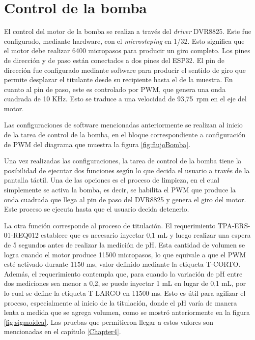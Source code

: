 \section{Control de la bomba}

El control del motor de la bomba se realiza a través del \textit{driver} DVR8825. Este fue configurado, mediante hardware, con el \textit{microsteping} en 1/32. Esto significa que el motor debe realizar 6400 micropasos para producir un giro completo. Los pines de dirección y de paso están conectados a dos pines del ESP32. El pin de dirección fue configurado mediante software para producir el sentido de giro que permite desplazar el titulante desde su recipiente hasta el de la muestra. En cuanto al pin de paso, este es controlado por PWM, que genera una onda cuadrada de 10 KHz. Esto se traduce a una velocidad de 93,75~rpm en el eje del motor.

Las configuraciones de software mencionadas anteriormente se realizan al inicio de la tarea de control de la bomba, en el bloque correspondiente a configuración de PWM del diagrama que muestra la figura \ref{fig:flujoBomba}.

Una vez realizadas las configuraciones, la tarea de control de la bomba tiene la posibilidad de ejecutar dos funciones según lo que decida el usuario a través de la pantalla táctil. Una de las opciones es el proceso de limpieza, en el cual simplemente se activa la bomba, es decir, se habilita el PWM que produce la onda cuadrada que llega al pin de paso del DVR8825 y genera el giro del motor. Este proceso se ejecuta hasta que el usuario decida detenerlo.

La otra función corresponde al proceso de titulación. El requerimiento TPA-ERS-01-REQ012 establece que es necesario inyectar 0,1 mL y luego realizar una espera de 5 segundos antes de realizar la medición de pH. Esta cantidad de volumen se logra cuando el motor produce 11500 micropasos, lo que equivale a que el PWM esté activado durante 1150 ms, valor definido mediante la etiqueta T-CORTO. Además, el requerimiento contempla que, para cuando la variación de pH entre dos mediciones  sea menor a 0,2, se puede inyectar 1 mL en lugar de 0,1 mL, por lo cual se define la etiqueta T-LARGO en 11500 ms. Esto es útil para agilizar el proceso, especialmente al inicio de la titulación, donde el pH varía de manera lenta a medida que se agrega volumen, como se mostró anteriormente en la figura \ref{fig:sigmoidea}. Las pruebas que permitieron llegar a estos valores son mencionadas en el capítulo \ref{Chapter4}.

